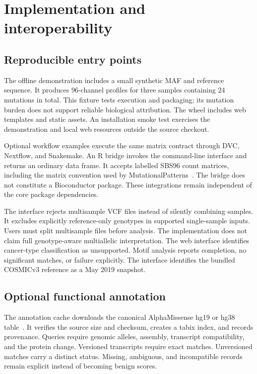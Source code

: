 \documentclass[11pt]{article}
\begin{document}
\section{Implementation and interoperability}
\subsection{Reproducible entry points}
The offline demonstration includes a small synthetic MAF and reference sequence.
It produces 96-channel profiles for three samples containing 24 mutations in total.
This fixture tests execution and packaging; its mutation burden does not support reliable biological attribution.
The wheel includes web templates and static assets.
An installation smoke test exercises the demonstration and local web resources outside the source checkout.

Optional workflow examples execute the same matrix contract through DVC, Nextflow, and Snakemake.
An R bridge invokes the command-line interface and returns an ordinary data frame.
It accepts labelled SBS96 count matrices, including the matrix convention used by MutationalPatterns~\cite{patterns}.
The bridge does not constitute a Bioconductor package.
These integrations remain independent of the core package dependencies.

The interface rejects multisample VCF files instead of silently combining samples.
It excludes explicitly reference-only genotypes in supported single-sample inputs.
Users must split multisample files before analysis.
The implementation does not claim full genotype-aware multiallelic interpretation.
The web interface identifies cancer-type classification as unsupported.
Motif analysis reports completion, no significant matches, or failure explicitly.
The interface identifies the bundled COSMICv3 reference as a May 2019 snapshot.

\subsection{Optional functional annotation}
The annotation cache downloads the canonical AlphaMissense hg19 or hg38 table~\cite{alphamissense}.
It verifies the source size and checksum, creates a tabix index, and records provenance.
Queries require genomic alleles, assembly, transcript compatibility, and the protein change.
Versioned transcripts require exact matches.
Unversioned matches carry a distinct status.
Missing, ambiguous, and incompatible records remain explicit instead of becoming benign scores.
\end{document}

